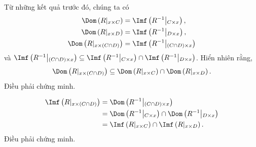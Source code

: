 \stepSubexercise Từ những kết quả trước đó, chúng ta có
\begin{align*}
   \Dom\left(R|_{x \times C}\right) &= \Imf\left(R^{-1}\middle|_{C \times x} \right), \\
   \Dom\left(R|_{x \times D}\right) &= \Imf\left(R^{-1}\middle|_{D \times x} \right), \\
   \Dom\left(R|_{x \times (C \cap D)}\right) &= \Imf\left(R^{-1}\middle|_{(C \cap D) \times x} \right)
\end{align*} và $\Imf\left(R^{-1}\middle|_{(C \cap D) \times x} \right) \subseteq \Imf\left(R^{-1}\middle|_{C \times x} \right) \cap \Imf\left(R^{-1}\middle|_{D \times x} \right)$. Hiển nhiên rằng, \begin{equation*}
   \Dom\left(R|_{x \times (C \cap D)}\right) \subseteq \Dom\left(R|_{x \times C}\right) \cap \Dom\left(R|_{x \times D}\right).
\end{equation*}
Điều phải chứng minh.

\stepSubexercise \begin{align*}
   \Imf\left(R|_{x \times (C \cap D)}\right) &= \Dom\left(R^{-1}\middle|_{(C \cap D) \times x}\right)\\
      &= \Dom\left(R^{-1}\middle|_{C \times x}\right) \cap \Dom\left(R^{-1}\middle|_{D \times x}\right) \\
      &= \Imf\left(R|_{x \times C}\right) \cap \Imf\left(R|_{x \times D}\right).
\end{align*}
Điều phải chứng minh.

